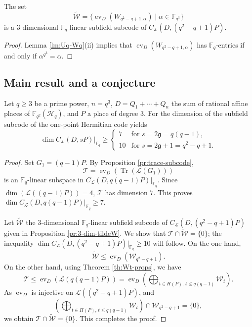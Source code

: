 \documentclass[entropy,article,submit,pdftex,moreauthors]{Definitions/mdpi}
\DeclareMathOperator{\ev}{ev}
\DeclareMathOperator{\trace}{Tr}
\newcommand{\g}{\mathfrak{g}}
\begin{document}
\begin{Proposition} \label{pr:3-dim-tildeW}
The set 
\[\widetilde{\mathcal{W}} = \{\ev_D(W_{q^2-q+1, \alpha}) \mid \alpha \in \mathbb{F}_{q^3}\}\]
is a $3$-dimensional $\mathbb{F}_q$-linear subfield subcode of $C_\mathcal{L}(D,(q^2-q+1)P)$.
\end{Proposition}
\begin{proof}
Lemma \ref{lm:Uq-Wq}(ii) implies that $\ev_D(W_{q^2-q+1,\alpha})$ has $\mathbb{F}_q$-entries if and only if $\alpha^{q^3}=\alpha$. 
\end{proof}




\subsection{Main result and a conjecture}

\begin{Theorem} \label{th:subcodes-dim}
	Let $q \geq 3$ be a prime power, $n=q^3$, $D=Q_1+\cdots+Q_n$ the sum of rational affine places of $\mathbb{F}_{q^2}(\mathscr{H}_q)$, and $P$ a place of degree $3$. For the dimension of the subfield subcode of the one-point Hermitian code yields
	\[ \dim C_\mathcal{L}(D,sP)|_{\mathbb{F}_q}\geq \begin{cases} 
		7 & \text {for $s=2\mathfrak{g}=q(q-1)$,} \\ 
		10 & \text{for $s=2\g +1=q^2-q+1$.}
	\end{cases}\]
\end{Theorem}
\begin{proof}%
Set $G_1=(q-1)P$. By Proposition \ref{pr:trace-subcode},
\[\mathcal{T}=\ev_D(\trace(\mathscr{L}(G_1)))\]
is an $\mathbb{F}_q$-linear subspace in $C_\mathcal{L}(D,q(q-1)P)|_{\mathbb{F}_q}$. Since $\dim(\mathscr{L}((q-1)P))=4$, $\mathcal{T}$ has dimension $7$. This proves $\dim C_\mathcal{L}(D,q(q-1)P)|_{\mathbb{F}_q}\geq 7$. 

Let $\widetilde{\mathcal{W}}$ the $3$-dimensional $\mathbb{F}_q$-linear subfield subcode of $C_\mathcal{L}(D,(q^2-q+1)P)$ given in Proposition \ref{pr:3-dim-tildeW}. We show that $\mathcal{T} \cap \widetilde{\mathcal{W}} = \{0\}$; the inequality $\dim C_\mathcal{L}(D,(q^2-q+1)P)|_{\mathbb{F}_q}\geq 10$ will follow. On the one hand,  
\[\widetilde{\mathcal{W}}\leq \ev_D(\mathcal{W}_{q^2-q+1}).\] 
On the other hand, using Theorem \ref{th:Wt-props}, we have
\[\mathcal{T} \leq \ev_D(\mathscr{L}(q(q-1)P)) = \ev_D\left( \bigoplus_{t\in H(P), \, t\leq q(q-1)} \mathcal{W}_t \right).\]
As $\ev_D$ is injective on $\mathscr{L}((q^2-q+1)P)$, and
\[\left( \bigoplus_{t\in H(P), \, t\leq q(q-1)} \mathcal{W}_t \right) \cap \mathcal{W}_{q^2-q+1}=\{0\},\]
we obtain $\mathcal{T} \cap \widetilde{\mathcal{W}} = \{0\}$. This completes the proof.
\end{proof}
\end{document}
